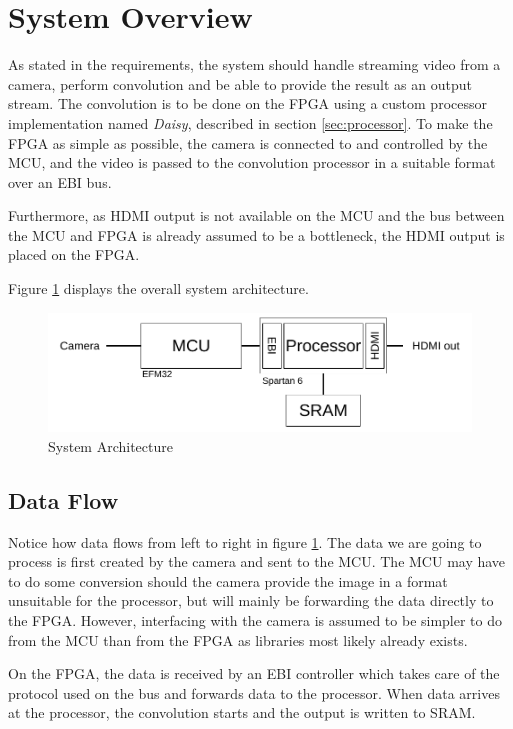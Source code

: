 \section{System Overview}

As stated in the requirements, the system should handle streaming video from a camera, perform convolution and be able to provide the result as an output stream.
The convolution is to be done on the FPGA using a custom processor implementation named \textit{Daisy}, described in section \ref{sec:processor}.
To make the FPGA as simple as possible, the camera is connected to and controlled by the MCU, and the video is passed to the convolution processor in a suitable format over an EBI bus.

Furthermore, as HDMI output is not available on the MCU and the bus between the MCU and FPGA is already assumed to be a bottleneck, the HDMI output is placed on the FPGA.

Figure \ref{fig:systemArchitecture} displays the overall system architecture.

\begin{figure}
    \includegraphics{img/SystemArchitecture.pdf}
    \caption{System Architecture}
    \label{fig:systemArchitecture}
\end{figure}



\subsection{Data Flow}
Notice how data flows from left to right in figure \ref{fig:systemArchitecture}.
The data we are going to process is first created by the camera and sent to the MCU.
The MCU may have to do some conversion should the camera provide the image in a format unsuitable for the processor, but will mainly be forwarding the data directly to the FPGA.
However, interfacing with the camera is assumed to be simpler to do from the MCU than from the FPGA as libraries most likely already exists.

On the FPGA, the data is received by an EBI controller which takes care of the protocol used on the bus and forwards data to the processor.
When data arrives at the processor, the convolution starts and the output is written to SRAM.

